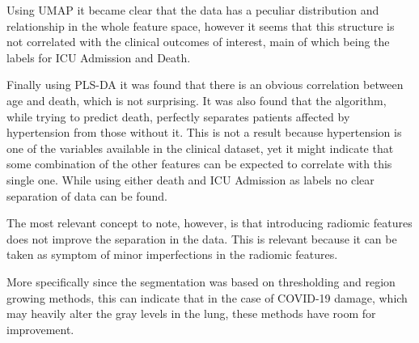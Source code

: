Using UMAP it became clear that the data has a peculiar distribution and relationship in the whole feature space, however it seems that this structure is not correlated with the clinical outcomes of interest, main of which being the labels for ICU Admission and Death. 

Finally using PLS-DA it was found that there is an obvious correlation between age and death, which is not surprising. It was also found that the algorithm, while trying to predict death, perfectly separates patients affected by hypertension from those without it. This is not  a result because hypertension is one of the variables available in the clinical dataset, yet it might indicate that some combination of the other features can be expected to correlate with this single one. While using either death and ICU Admission as labels no clear separation of data can be found.

The most relevant concept to note, however, is that introducing radiomic features does not improve the separation in the data.
This is relevant because it can be taken as symptom of minor imperfections in the radiomic features.

More specifically since the segmentation was based on thresholding and region growing methods, this can indicate that in the case of COVID-19 damage, which may heavily alter the gray levels in the lung, these methods have room for improvement.